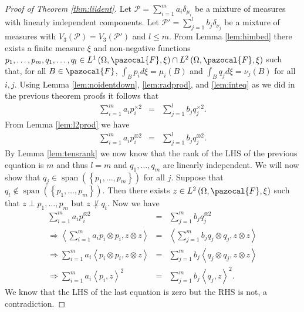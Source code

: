 \documentclass[aos,preprint]{imsart}
\def\l{\left}
\def\r{\right}
\def\sF{\pazocal{F}}
\def\sP{\mathscr{P}}
\def\spn{\operatorname{span}}
\theoremstyle{plain}
\theoremstyle{defintion}
\begin{document}
	\begin{proof}[Proof of Theorem \ref{thm:liident}]
		Let $\sP = \sum_{i=1}^m a_i \delta_{\mu_i}$ be a mixture of measures with linearly independent components. Let $\sP' = \sum_{j=1}^l  b_j \delta_{\nu_j}$ be a mixture of measures with $V_3(\sP) = V_3(\sP')$ and $l\le m$. From Lemma \ref{lem:himbed} there exists a finite measure $\xi$ and non-negative functions $p_1,\ldots,p_m,q_1,\ldots,q_l \in L^1\left( \Omega, \sF, \xi \right)\cap L^2\left( \Omega, \sF, \xi \right)$ such that, for all $B\in \sF$, $\int_B p_i d\xi = \mu_i(B)$ and $\int_B q_j d\xi = \nu_j(B)$ for all $i,j$. Using Lemma \ref{lem:noidentdown}, \ref{lem:radprod}, and \ref{lem:inteq} as we did in the previous theorem proofs it follows that
		\begin{eqnarray*}
			\sum_{i=1}^m a_i p_i^{\times 2}   &=& \sum_{j=1}^l b_j q_j^{\times 2}.
		\end{eqnarray*}
		From Lemma \ref{lem:l2prod} we have
		\begin{eqnarray*}
			\sum_{i=1}^m a_i p_i^{\otimes 2}   &=& \sum_{j=1}^l b_j q_j^{\otimes 2}.
		\end{eqnarray*}
		By Lemma \ref{lem:tensrank} we now know that the rank of the LHS of the previous equation is $m$ and thus $l=m$ and $q_1,\ldots,q_m$ are linearly independent.
		We will now show that $q_j\in \spn\left( \l\{p_1,\ldots,p_m \r\}\right)$ for all $j$. Suppose that $q_t \notin \spn\left(\l\{ p_1,\ldots,p_m \r\}\right)$. Then there exists $z\in L^2\left( \Omega,\sF,\xi \right)$ such that $z\perp p_1,\ldots ,p_m$ but $z \not \perp q_t$. Now we have 
		\begin{eqnarray*}
			\sum_{i=1}^m a_i p_i^{\otimes 2}   &=& \sum_{j=1}^m b_j q_j^{\otimes 2}\\
			\Rightarrow \l<\sum_{i=1}^m a_i p_i\otimes p_i, z\otimes z\r>   &=& \l<\sum_{j=1}^m b_j q_j \otimes q_j,z\otimes z\r> \\
			\Rightarrow \sum_{i=1}^m a_i \l< p_i \otimes p_i, z\otimes z\r>   &=& \sum_{j=1}^m b_j \l<  q_j\otimes q_j,z\otimes z\r> \\
			\Rightarrow \sum_{i=1}^m a_i \l< p_i , z\r>^2   &=& \sum_{j=1}^m b_j \l<  q_j,z\r>^2.
		\end{eqnarray*}
		We know that the LHS of the last equation is zero but the RHS is not, a contradiction.


\end{proof}
\end{document}
